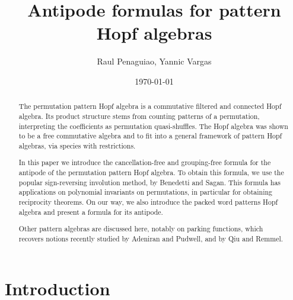 \documentclass[12pt, reqno]{amsart}
\theoremstyle{definition}
\begin{document}
\title{Antipode formulas for pattern Hopf algebras} %



\author{Raul Penaguiao, Yannic Vargas}
\address{San Francisco State University}
\address{Technische Universit\"at Graz}
\date{\today} %

\begin{abstract}
The permutation pattern Hopf algebra is a commutative filtered and connected Hopf algebra.
Its product structure stems from counting patterns of a permutation, interpreting the coefficients as permutation quasi-shuffles.
The Hopf algebra was shown to be a free commutative algebra and to fit into a general framework of pattern Hopf algebras, via species with restrictions.

In this paper we introduce the cancellation-free and grouping-free formula for the antipode of the permutation pattern Hopf algebra.
To obtain this formula, we use the popular sign-reversing involution method, by Benedetti and Sagan.
This formula has applications on polynomial invariants on permutations, in particular for obtaining reciprocity theorems.
On our way, we also introduce the packed word patterns Hopf algebra and present a formula for its antipode.

Other pattern algebras are discussed here, notably on parking functions, which recovers notions recently studied by Adeniran and Pudwell, and by Qiu and Remmel.
\end{abstract}


\maketitle

\tableofcontents

\section{Introduction}
\end{document}
